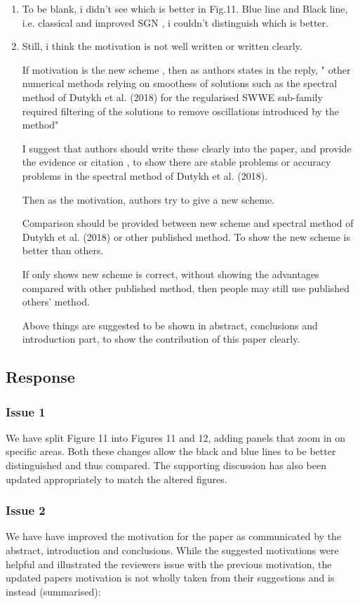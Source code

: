 \documentclass[10pt]{article}
\begin{document}
\begin{enumerate}
	\item To be blank, i didn't see which is better in Fig.11. 
	Blue line and Black line, 
	i.e. classical and improved SGN , 
	i couldn't distinguish which is better.
	\item  Still, i think the motivation is not well written or written clearly.
	
	If motivation is the new scheme ,
	then as authors states in the reply,
	" other numerical methods relying on smoothess of solutions such as the
	spectral method of Dutykh et al. (2018) for the regularised SWWE sub-family required filtering of the solutions to remove oscillations introduced
	by the method"
	
	I suggest that authors should write these clearly into the paper, and provide the evidence or citation , to show there are stable problems or accuracy problems in the
	spectral method of Dutykh et al. (2018).
	
	Then as the motivation, authors try to give a new scheme. 
	
	Comparison should be provided between new scheme and spectral method of Dutykh et al. (2018) or other published method.
	To show the new scheme is better than others.
	
	If only shows new scheme is correct, without showing the advantages compared with other published method, then people may still use published others' method.
	
	Above things are suggested to be shown in abstract, conclusions and introduction part, to show the contribution of this paper clearly.
\end{enumerate}



\subsection{Response}
\subsubsection{Issue 1}
We have split Figure 11 into Figures 11 and 12, adding panels that zoom in on specific areas. Both these changes allow the black and blue lines to be better distinguished and thus compared. The supporting discussion has also been updated appropriately to match the altered figures.

\subsubsection{Issue 2}
We have have improved the motivation for the paper as communicated by the abstract, introduction and conclusions. While the suggested motivations were helpful and illustrated the reviewers issue with the previous motivation, the updated papers motivation is not wholly taken from their suggestions and is instead (summarised):
\end{document}
